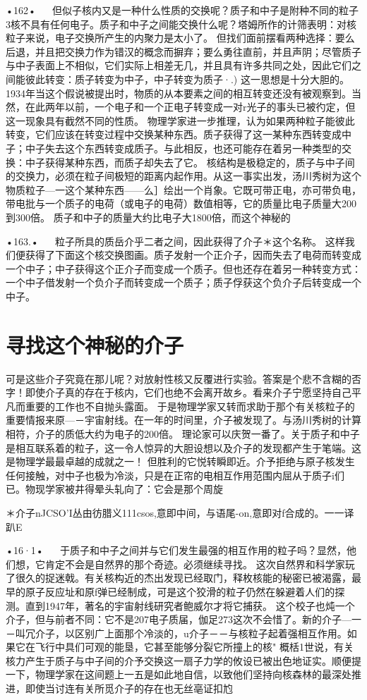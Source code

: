 •162•
  
但似子核内又是一种什么性质的交换呢？质子和中子是附种不同的粒子3核不具有任何电子。质子和中子之间能交换什么呢？塔姆所作的计筛表明：对核粒子来说，电子交换所产生的内聚力是太小了。
但找们面前摆看两种选择：要么后退，并且把交换力作为错汉的概念而摒弃；要么勇往直前，并且声阴；尽管质子与中子表面上不相似，它们实际上相差无几，并且具有许多共同之处，因此它们之间能彼此转变：质子转变为中子，中子转变为质子·.)
这一思想是十分大胆的。1934年当这个假说被提出时，物质的从本要素之间的相互转变还没有被观察到。当然，在此两年以前，一个电子和一个正电子转变成一对r光子的事头已被彴定，但这一现象具有截然不同的性质。
物理学家进一步推理，认为如果两种粒子能彼此转变，它们应该在转变过程中交换某种东西。质子获得了这一某种东西转变成中子；中子失去这个东西转变成质子。与此相反，也还可能存在着另一种类型的交换：中子获得某种东西，而质子却失去了它。
核结构是极稳定的，质子与中子间的交换力，必须在粒子间极短的距离内起作用。从这一事实出发，汤川秀树为这个物质粒子—一这个某种东西——么］绘出一个肖象。它既可带正电，亦可带负电，带电批与一个质子的电荷（或电子的电荷）数值相等，它的质量比电子质量大200到300倍。
质子和中子的质量大约比电子大1800倍，而这个神秘的

•163.•
  
粒子所具的质岳介乎二者之间，因此获得了介子＊这个名称。
这样我们便获得了下面这个核交换图画。质子发射一个正介子，因而失去了电荷而转变成一个中子；中子获得这个正介子而变成一个质子。但也还存在着另一种转变方式：一个中子借发射一个负介子而转变成一个质子；质子俘获这个负介子后转变成一个中子。

\section{寻找这个神秘的介子}

可是这些介子究竟在那儿呢？对放射性核又反覆进行实验。答案是个悲不含糊的否字！即使介子真的存在于核内，它们也绝不会离开故乡。看来介子宁愿坚持自己平凡而重要的工作也不自抛头露面。
于是物理学家又转而求助于那个有关核粒子的重要情报来原—－宇宙射线。在一年的时间里，介子被发现了。与汤川秀树的计算相符，介子的质低大约为电子的200倍。
理论家可以庆贺一番了。关于质子和中子是相互联系着的粒子，这一令人惊异的大胆设想以及介子的发现都产生于笔端。这是物理学最最卓越的成就之一！
但胜利的它悦转瞬即近。介予拒绝与原子核发生任何接触，对中子也极为冷淡，只是在正帘的电相互作用范围内屈从于质子i们已。物现学家被井得晕头轧向了：它会是那个周旋

＊介子nJCSO'I丛由彷腊义111csos,意即中间，与语尾-on,意即对f合成的。一一译趴E

•16·1•
  
于质子和中子之间并与它们发生最强的相互作用的粒子吗？显然，他们想，它肯定不会是自然界的那个奇迹。必须继续寻找。
这次自然界和科学家玩了很久的捉迷戟。有关核构近的杰出发现已经取门，释枚核能的秘密已被渴露，最早的原子反应址和原f弹已经制成，可是这个狡滑的粒子仍然在躲避着人们的探测。直到1947年，著名的宇宙射线研究者鲍威尔才将它捕获。
这个校子也炖一个介子，但与前者不同：它不是207电子质届，伽足273这次不会惜了。新的介子—一－叫冗介子，以区别广上面那个冷淡的，u介子－－与核粒子起着强相互作用。如果它在飞行中具们可观的能垦，它甚至能够分裂它所撞上的核"
概栝1世说，有关核力产生于质子与中子间的介予交换这一扇子力学的攸设已被出色地证实。顺便提一下，物理学家在这间题上一五是如此地自信，以致他们坚持向核森林的最深处推进，即使当讨连有关所觅介子的存在也无丝亳证扣尥


